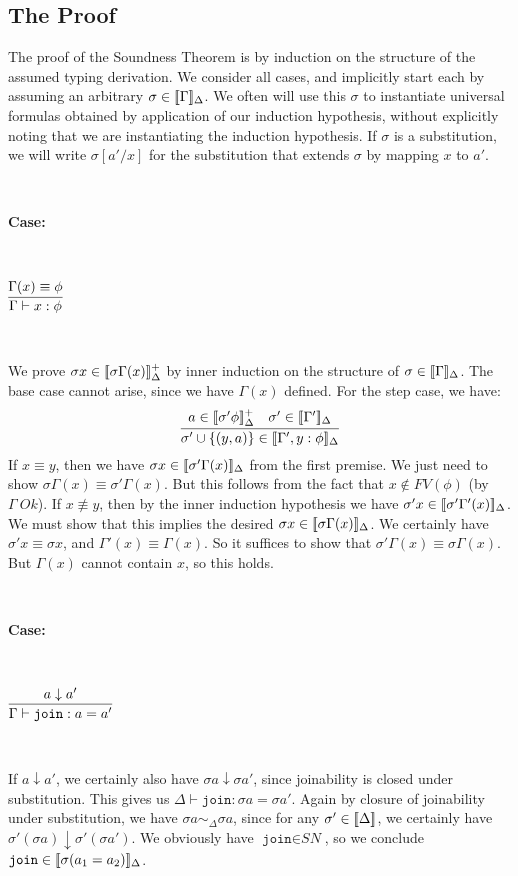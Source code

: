 \documentclass[copyright]{eptcs}
\newcommand{\SN}[0]{\textit{SN}}
\newcommand{\join}[0]{\texttt{join}}
\newcommand{\interp}[1]{[\negthinspace[#1]\negthinspace]}
\begin{document}
\subsection{The Proof}

The proof of the Soundness Theorem is by induction on the structure of
the assumed typing derivation.  We consider all cases, and implicitly
start each by assuming an arbitrary $\sigma\in\interp{\Gamma}_\Delta$.
We often will use this $\sigma$ to instantiate universal formulas
obtained by application of our induction hypothesis, without
explicitly noting that we are instantiating the induction hypothesis.
If $\sigma$ is a substitution, we will write $\sigma[a'/x]$ for the
substitution that extends $\sigma$ by mapping $x$ to $a'$.

\ 

\noindent \textbf{Case:}

\

$\infer{\Gamma\vdash x:\phi}{\Gamma(x) \equiv \phi}$

\ 

\noindent We prove $\sigma x\in\interp{\sigma \Gamma(x)}^+_{\Delta}$ by
inner induction on the structure of
$\sigma\in\interp{\Gamma}_{\Delta}$.  The base case cannot arise,
since we have $\Gamma(x)$ defined.  For the step case, we have:
\[
\infer{\sigma'\cup\{(y,a)\}\in\interp{\Gamma',y:\phi}_{\Delta}}
      {a\in\interp{\sigma' \phi}^+_{\Delta} & 
      \sigma' \in\interp{\Gamma'}_{\Delta}}
\]
\noindent If $x\equiv y$, then we have $\sigma x\in\interp{\sigma'
  \Gamma(x)}_{\Delta}$ from the first premise.  We just need to show
$\sigma \Gamma(x) \equiv \sigma' \Gamma(x)$.  But this follows from
the fact that $x\not\in\textit{FV}(\phi)$ (by $\Gamma\ \textit{Ok}$).
If $x\not\equiv y$, then by the inner induction hypothesis we have
$\sigma' x\in\interp{\sigma' \Gamma'(x)}_{\Delta}$.  We must show that
this implies the desired $\sigma x\in\interp{\sigma
  \Gamma(x)}_{\Delta}$.  We certainly have $\sigma' x \equiv \sigma
x$, and $\Gamma'(x)\equiv\Gamma(x)$.  So it suffices to show that
$\sigma' \Gamma(x)\equiv \sigma\Gamma(x)$.  But $\Gamma(x)$ cannot
contain $x$, so this holds.

\ 

\noindent \textbf{Case:}

\

$\infer{\Gamma\vdash \join : a = a'}{a \downarrow a'}$

\ 

\noindent If $a\downarrow a'$, we certainly also have $\sigma a
\downarrow \sigma a'$, since joinability is closed under substitution.
This gives us $\Delta\vdash \join : \sigma a = \sigma a'$.  Again by
closure of joinability under substitution, we have $\sigma a
\sim_\Delta \sigma a$, since for any $\sigma'\in\interp{\Delta}$, we
certainly have $\sigma'(\sigma a)\downarrow \sigma'(\sigma a')$.  We
obviously have $\join\in\SN$, so we conclude
$\join\in\interp{\sigma(a_1 = a_2)}_{\Delta}$.
\end{document}
